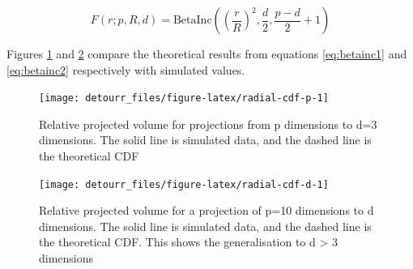 \begin{equation}
F(r; p, R, d) = \mathrm{BetaInc}\left(\left(\frac{r}{R}\right)^2, \frac{d}{2}, \frac{p-d}{2}+1\right)
\label{eq:betainc2}
\end{equation}

Figures \ref{fig:radial-cdf-p} and \ref{fig:radial-cdf-d} compare the
theoretical results from equations \eqref{eq:betainc1} and
\eqref{eq:betainc2} respectively with simulated values.

\begin{Schunk}
\begin{figure}
\texttt{[image: detourr\_files/figure-latex/radial-cdf-p-1]} \caption[Relative projected volume for projections from p dimensions to d=3 dimensions]{Relative projected volume for projections from p dimensions to d=3 dimensions. The solid line is simulated data, and the dashed line is the theoretical CDF}\label{fig:radial-cdf-p}
\end{figure}
\end{Schunk}

\begin{Schunk}
\begin{figure}
\texttt{[image: detourr\_files/figure-latex/radial-cdf-d-1]} \caption[Relative projected volume for a projection of p=10 dimensions to d dimensions]{Relative projected volume for a projection of p=10 dimensions to d dimensions.  The solid line is simulated data, and the dashed line is the theoretical CDF. This shows the generalisation to d > 3 dimensions}\label{fig:radial-cdf-d}
\end{figure}
\end{Schunk}



\address{%
Casper Hart\\
University of Auckland\\%
\\
%
%
%
%
}
